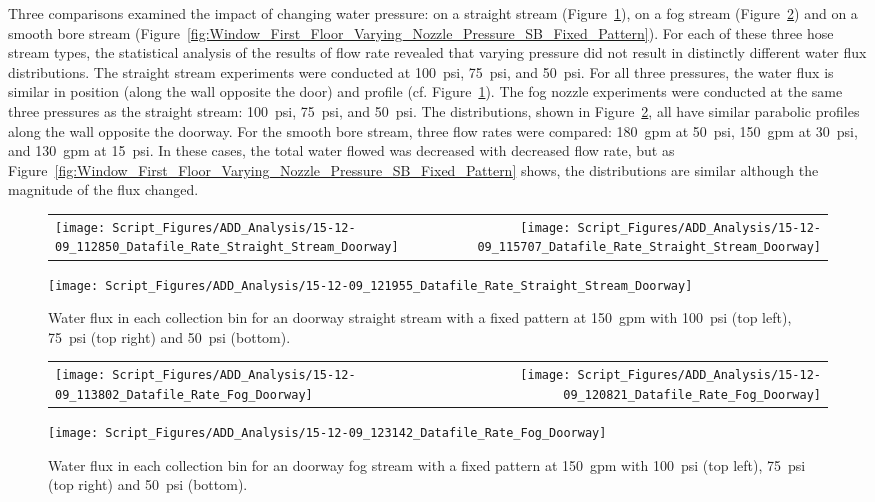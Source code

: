 \documentclass[12pt,oneside]{book}
\begin{document}
Three comparisons examined the impact of changing water pressure: on a straight stream (Figure~\ref{fig:Doorway_Varying_Nozzle_Pressure_SS_Fixed_Pattern}), on a fog stream (Figure~\ref{fig:Doorway_Varying_Nozzle_Pressure_Fog_Fixed_Pattern}) and on a smooth bore stream (Figure~\ref{fig:Window_First_Floor_Varying_Nozzle_Pressure_SB_Fixed_Pattern}). For each of these three hose stream types, the statistical analysis of the results of flow rate revealed that varying pressure did not result in distinctly different water flux distributions. The straight stream experiments were conducted at 100~psi, 75~psi, and 50~psi. For all three pressures, the water flux is similar in position (along the wall opposite the door) and profile (cf. Figure~\ref{fig:Doorway_Varying_Nozzle_Pressure_SS_Fixed_Pattern}). The fog nozzle experiments were conducted at the same three pressures as the straight stream: 100~psi, 75~psi, and 50~psi. The distributions, shown in Figure~\ref{fig:Doorway_Varying_Nozzle_Pressure_Fog_Fixed_Pattern}, all have similar parabolic profiles along the wall opposite the doorway. For the smooth bore stream, three flow rates were compared: 180~gpm at 50~psi, 150~gpm at 30~psi, and 130~gpm at 15~psi. In these cases, the total water flowed was decreased with decreased flow rate, but as Figure~\ref{fig:Window_First_Floor_Varying_Nozzle_Pressure_SB_Fixed_Pattern} shows, the distributions are similar although the magnitude of the flux changed.

\begin{figure}[ht]
\begin{tabular*}{\textwidth}{lr}
\texttt{[image: Script\_Figures/ADD\_Analysis/15-12-09\_112850\_Datafile\_Rate\_Straight\_Stream\_Doorway]} &
\texttt{[image: Script\_Figures/ADD\_Analysis/15-12-09\_115707\_Datafile\_Rate\_Straight\_Stream\_Doorway]} \\
\end{tabular*}
\centering
\texttt{[image: Script\_Figures/ADD\_Analysis/15-12-09\_121955\_Datafile\_Rate\_Straight\_Stream\_Doorway]}
\caption[Water Flux Varying Pressure with Straight Stream]{Water flux in each collection bin for an doorway straight stream with a fixed pattern at 150~gpm with 100~psi (top left), 75~psi (top right) and 50~psi (bottom).}
\label{fig:Doorway_Varying_Nozzle_Pressure_SS_Fixed_Pattern}
\end{figure}

\begin{figure}[ht]
\begin{tabular*}{\textwidth}{lr}
\texttt{[image: Script\_Figures/ADD\_Analysis/15-12-09\_113802\_Datafile\_Rate\_Fog\_Doorway]} &
\texttt{[image: Script\_Figures/ADD\_Analysis/15-12-09\_120821\_Datafile\_Rate\_Fog\_Doorway]} \\
\end{tabular*}
\centering
\texttt{[image: Script\_Figures/ADD\_Analysis/15-12-09\_123142\_Datafile\_Rate\_Fog\_Doorway]}
\caption[Water Flux Varying Pressure with Fog Stream]{Water flux in each collection bin for an doorway fog stream with a fixed pattern at 150~gpm with 100~psi (top left), 75~psi (top right) and 50~psi (bottom).}
\label{fig:Doorway_Varying_Nozzle_Pressure_Fog_Fixed_Pattern}
\end{figure}
\end{document}
